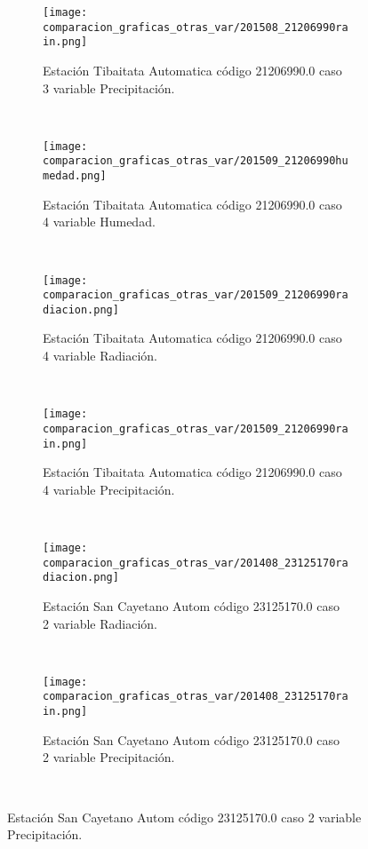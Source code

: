 \begin{figure}[H]
\centering
\begin{subfigure}[normla]{0.4\textwidth}
\caption{Estación Tibaitata Automatica código 21206990.0 caso 3 variable Precipitación.}
\texttt{[image: comparacion\_graficas\_otras\_var/201508\_21206990rain.png]}
\end{subfigure}
~
\begin{subfigure}[normla]{0.4\textwidth}
\caption{Estación Tibaitata Automatica código 21206990.0 caso 4 variable Humedad.}
\texttt{[image: comparacion\_graficas\_otras\_var/201509\_21206990humedad.png]}
\end{subfigure}
~
\begin{subfigure}[normla]{0.4\textwidth}
\caption{Estación Tibaitata Automatica código 21206990.0 caso 4 variable Radiación.}
\texttt{[image: comparacion\_graficas\_otras\_var/201509\_21206990radiacion.png]}
\end{subfigure}
~
\begin{subfigure}[normla]{0.4\textwidth}
\caption{Estación Tibaitata Automatica código 21206990.0 caso 4 variable Precipitación.}
\texttt{[image: comparacion\_graficas\_otras\_var/201509\_21206990rain.png]}
\end{subfigure}
~
\begin{subfigure}[normla]{0.4\textwidth}
\caption{Estación San Cayetano Autom  código 23125170.0 caso 2 variable Radiación.}
\texttt{[image: comparacion\_graficas\_otras\_var/201408\_23125170radiacion.png]}
\end{subfigure}
~
\begin{subfigure}[normla]{0.4\textwidth}
\caption{Estación San Cayetano Autom  código 23125170.0 caso 2 variable Precipitación.}
\texttt{[image: comparacion\_graficas\_otras\_var/201408\_23125170rain.png]}
\end{subfigure}
~
\end{figure}
           
